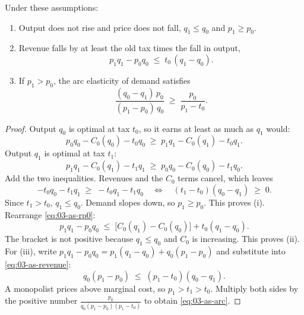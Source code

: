 \begin{proposition}\label{prop:03-as-inequality}
Under these assumptions:
\begin{enumerate}[label=(\roman*)]
  \item Output does not rise and price does not fall, $q_1 \le q_0$ and $p_1 \ge p_0$.
  \item Revenue falls by at least the old tax times the fall in output,
  \begin{equation}\label{eq:03-as-revenue}
    p_1 q_1 - p_0 q_0 \;\le\; t_0\,(q_1 - q_0).
  \end{equation}
  \item If $p_1 > p_0$, the arc elasticity of demand satisfies
  \begin{equation}\label{eq:03-as-arc}
    \frac{(q_0 - q_1)\, p_0}{(p_1 - p_0)\, q_0} \;\ge\; \frac{p_0}{p_1 - t_0}.
  \end{equation}
\end{enumerate}
\end{proposition}

\begin{proof}
Output $q_0$ is optimal at tax $t_0$, so it earns at least as much as $q_1$ would:
\begin{equation}\label{eq:03-as-rp0}
  p_0 q_0 - C_0(q_0) - t_0 q_0 \;\ge\; p_1 q_1 - C_0(q_1) - t_0 q_1 .
\end{equation}
Output $q_1$ is optimal at tax $t_1$:
\begin{equation}\label{eq:03-as-rp1}
  p_1 q_1 - C_0(q_1) - t_1 q_1 \;\ge\; p_0 q_0 - C_0(q_0) - t_1 q_0 .
\end{equation}
Add the two inequalities. Revenues and the $C_0$ terms cancel, which leaves
\begin{equation*}
  -t_0 q_0 - t_1 q_1 \;\ge\; -t_0 q_1 - t_1 q_0
  \quad\Longleftrightarrow\quad
  (t_1 - t_0)(q_0 - q_1) \;\ge\; 0 .
\end{equation*}
Since $t_1 > t_0$, $q_1 \le q_0$. Demand slopes down, so $p_1 \ge p_0$. This proves (i). Rearrange
\eqref{eq:03-as-rp0}:
\begin{equation*}
  p_1 q_1 - p_0 q_0 \;\le\; \bigl[C_0(q_1) - C_0(q_0)\bigr] + t_0 (q_1 - q_0).
\end{equation*}
The bracket is not positive because $q_1 \le q_0$ and $C_0$ is increasing. This proves (ii). For (iii),
write $p_1 q_1 - p_0 q_0 = p_1(q_1 - q_0) + q_0(p_1 - p_0)$ and substitute into \eqref{eq:03-as-revenue}:
\begin{equation*}
  q_0 (p_1 - p_0) \;\le\; (p_1 - t_0)(q_0 - q_1).
\end{equation*}
A monopolist prices above marginal cost, so $p_1 > t_1 > t_0$. Multiply both sides by the positive number
$\frac{p_0}{q_0 (p_1 - p_0)(p_1 - t_0)}$ to obtain \eqref{eq:03-as-arc}.
\end{proof}

